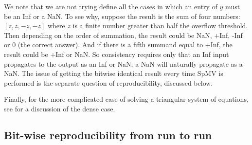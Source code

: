 \documentclass{article}
\begin{document}
We note that we are not trying define all the cases in which an entry of $y$
must be an Inf or a NaN. To see why, suppose the result
is the sum of four numbers: $[z, z, -z, -z]$ where $z$ is a finite number greater than
half the overflow threshold. Then depending on the order of summation, the result
could be NaN, +Inf, -Inf or 0 (the correct answer). And if there is a fifth summand
equal to +Inf, the result could be +Inf or NaN. So consistency requires only that
an Inf input propagates to the output as an Inf or NaN; a NaN will naturally
propagate as a NaN. The issue of getting the bitwise identical result every time SpMV
is performed is the separate question of reproducibility, discussed below.

Finally, for the more complicated case of solving a triangular
system of equations, see \cite{Proposed_BLAS_LAPACK_exception_handling}
for a discussion of the dense case.

\subsection{Bit-wise reproducibility from run to run} \label{sec:BitwiseReproducibility}

\begin{comment}
outline:
1. goal of reproducibility and motivation
2. conditions on reproducibility 
3. recommendations on levels of reproducibility in library
4. API to require reproducibility (question: can algorithm choice overrule reproducibility setting ?  or should an exception be thrown if non-reproducible alg is selected while global reproducibility it turned on ?)
\end{comment}
\end{document}
